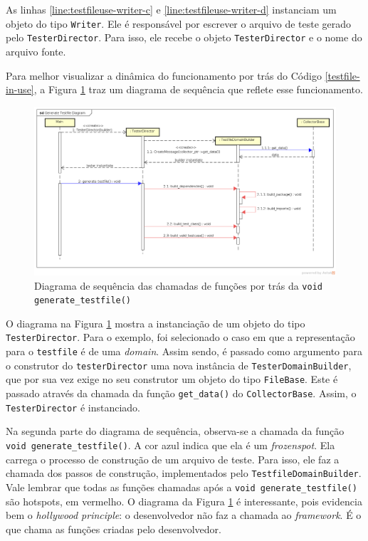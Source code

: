 As linhas \ref{line:testfileuse-writer-c} e \ref{line:testfileuse-writer-d}
instanciam um objeto do tipo \lstinline|Writer|. Ele é responsável por escrever
o arquivo de teste gerado pelo \lstinline|TesterDirector|. Para isso, ele
recebe o objeto \lstinline|TesterDirector| e o nome do arquivo fonte.

Para melhor visualizar a dinâmica do funcionamento por trás do Código
\ref{testfile-in-use}, a Figura \ref{generate-testfile-sequence-diagram}
traz um diagrama de sequência que reflete esse funcionamento.

\begin{landscape}
\begin{figure}[h]
  \centering
    \includegraphics[width=1.5\textwidth]{figuras/generate-testfile-sequence-diagram.png}
    \caption{Diagrama de sequência das chamadas de funções por trás da \lstinline|void generate_testfile()|}
    \label{generate-testfile-sequence-diagram}
\end{figure}
\FloatBarrier
\end{landscape}

O diagrama na Figura \ref{generate-testfile-sequence-diagram} mostra a instanciação
de um objeto do tipo \lstinline|TesterDirector|. Para o exemplo, foi selecionado
o caso em que a representação para o \lstinline|testfile| é de uma
\textit{domain}. Assim sendo, é passado como argumento para o construtor do
\lstinline|testerDirector| uma nova instância de \lstinline|TesterDomainBuilder|,
que por sua vez exige no seu construtor um objeto do tipo \lstinline|FileBase|.
Este é passado através da chamada da função \lstinline|get_data()| do
\lstinline|CollectorBase|. Assim, o \lstinline|TesterDirector| é instanciado.

Na segunda parte do diagrama de sequência, observa-se a chamada da função
\lstinline|void generate_testfile()|. A cor azul indica que ela é um
\textit{frozenspot}. Ela carrega o processo de construção de um
arquivo de teste. Para isso, ele faz a chamada dos passos de construção,
implementados pelo \lstinline|TestfileDomainBuilder|. Vale lembrar que
todas as funções chamadas após a \lstinline|void generate_testfile()| são
hotspots, em vermelho. O diagrama da Figura \ref{generate-testfile-sequence-diagram}
é interessante, pois evidencia bem o \textit{hollywood principle}: o
desenvolvedor não faz a chamada ao \textit{framework}. É o \framework que chama
as funções criadas pelo desenvolvedor.


